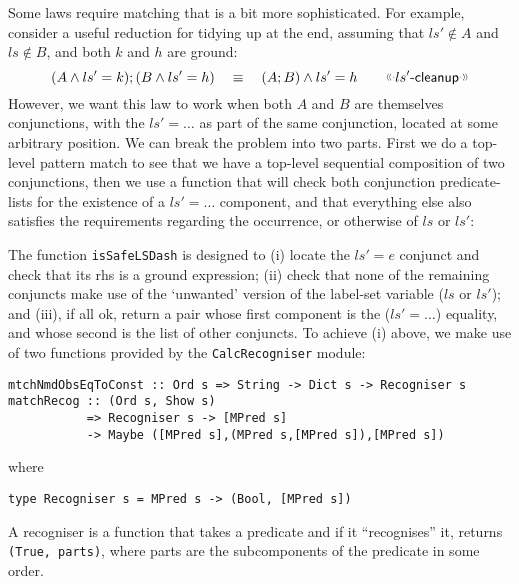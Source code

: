 Some laws require matching that is a bit more sophisticated.
For example,
consider a useful reduction for tidying up at the end,
assuming that $ls' \notin A$ and $ls \notin B$, and both $k$ and $h$
are ground:
\[
   (A \land ls'=k) ; (B \land ls'= h)
   \quad\equiv\quad
   (A;B) \land ls'=h
   \qquad \elabel{$ls'$-cleanup}
\]
However, we want this law to work when both $A$
and $B$ are themselves conjunctions, with the $ls'=\dots$
as part of the same conjunction, located at some arbitrary position.
We can break the problem into two parts.
First we do a top-level pattern match
to see that we have a top-level sequential composition
of two conjunctions,
then we use a function that will check both conjunction predicate-lists
for the existence of a $ls'=\dots$ component,
and that everything else also satisfies the requirements regarding
the occurrence, or otherwise of $ls$ or $ls'$:
The function \texttt{isSafeLSDash}
is designed to
(i) locate the $ls'=e$ conjunct and check that its rhs is a ground expression;
(ii) check that none of the remaining conjuncts make use of the
`unwanted' version of the label-set variable ($ls$ or $ls'$);
and (iii), if all ok, return a pair
whose first component is the ($ls'=\dots$) equality,
and whose second is the list of other conjuncts.
To achieve (i) above,
we make use of two functions provided by the \texttt{CalcRecogniser} module:
\begin{verbatim}
mtchNmdObsEqToConst :: Ord s => String -> Dict s -> Recogniser s
matchRecog :: (Ord s, Show s)
           => Recogniser s -> [MPred s]
           -> Maybe ([MPred s],(MPred s,[MPred s]),[MPred s])
\end{verbatim}
where
\begin{verbatim}
type Recogniser s = MPred s -> (Bool, [MPred s])
\end{verbatim}
A recogniser is a function that takes a predicate
and if it ``recognises'' it, returns \texttt{(True, parts)},
where parts are the subcomponents of the predicate in some order.
